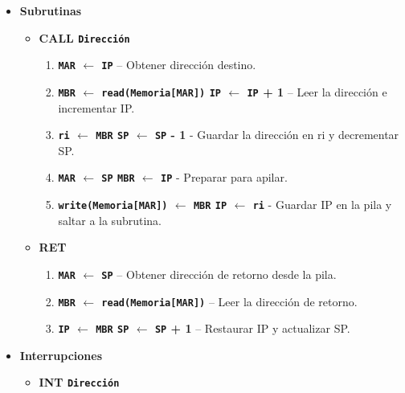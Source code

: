 \documentclass[12pt,oneside]{templates/unerthesis}
\providecommand{\tightlist}{%
  \setlength{\itemsep}{0pt}\setlength{\parskip}{0pt}}
\begin{document}
\begin{itemize}
\tightlist
\item
  \textbf{Subrutinas}

  \begin{itemize}
  \tightlist
  \item
    \textbf{CALL \texttt{Dirección}}

    \begin{enumerate}
    \def\labelenumi{\arabic{enumi}.}
    \setcounter{enumi}{3}
    \tightlist
    \item
      \textbf{\texttt{MAR} \(\leftarrow\) \texttt{IP}} -- Obtener dirección destino.
    \item
      \textbf{\texttt{MBR} \(\leftarrow\) \texttt{read(Memoria{[}MAR{]})} \textbar{} \texttt{IP} \(\leftarrow\) \texttt{IP} + 1} -- Leer la dirección e incrementar IP.
    \item
      \textbf{\texttt{ri} \(\leftarrow\) \texttt{MBR} \textbar{} \texttt{SP} \(\leftarrow\) \texttt{SP} - 1} - Guardar la dirección en ri y decrementar SP.
    \item
      \textbf{\texttt{MAR} \(\leftarrow\) \texttt{SP} \textbar{} \texttt{MBR} \(\leftarrow\) \texttt{IP}} - Preparar para apilar.
    \item
      \textbf{\texttt{write(Memoria{[}MAR{]})} \(\leftarrow\) \texttt{MBR} \textbar{} \texttt{IP} \(\leftarrow\) \texttt{ri}} - Guardar IP en la pila y saltar a la subrutina.
    \end{enumerate}
  \item
    \textbf{RET}

    \begin{enumerate}
    \def\labelenumi{\arabic{enumi}.}
    \setcounter{enumi}{3}
    \tightlist
    \item
      \textbf{\texttt{MAR} \(\leftarrow\) \texttt{SP}} -- Obtener dirección de retorno desde la pila.
    \item
      \textbf{\texttt{MBR} \(\leftarrow\) \texttt{read(Memoria{[}MAR{]})}} -- Leer la dirección de retorno.
    \item
      \textbf{\texttt{IP} \(\leftarrow\) \texttt{MBR}\textbar{} \texttt{SP} \(\leftarrow\) \texttt{SP} + 1} -- Restaurar IP y actualizar SP.
    \end{enumerate}
  \end{itemize}
\item
  \textbf{Interrupciones}

  \begin{itemize}
  \tightlist
  \item
    \textbf{INT \texttt{Dirección}}


\end{itemize}
\end{itemize}
\end{document}
